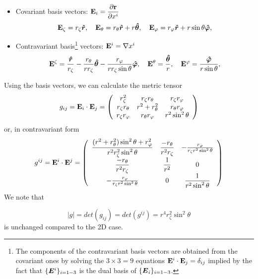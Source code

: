 \begin{itemize}
\item Covariant basis vectors: $\displaystyle\mathbf{E}_i=\frac{\partial\mathbf{r}}
{\partial x^i}$
\begin{equation}
\mathbf{E}_\zeta=r_\zeta\boldsymbol{\hat r}, \quad
\mathbf{E}_\theta=r_\theta\boldsymbol{\hat r}+r\boldsymbol{\hat \theta}, \quad
\mathbf{E}_\varphi=r_\varphi\boldsymbol{\hat r}+r\sin\theta\boldsymbol{\hat \varphi},
\end{equation}
\item Contravariant basis\footnote{The components of the contravariant
basis vectors are obtained from the covariant ones by solving the
$3\times3=9$ equations $\mathbf{E}^i\cdot\mathbf{E}_j=\delta_{ij}$ implied by
the fact that $\{\vE^i\}_{i=1-3}$ is the dual basis of
$\{\vE_i\}_{i=1-3}$.} vectors: $\mathbf{E}^i=\nabla x^i$
\begin{equation}
\mathbf{E}^\zeta=\frac{\boldsymbol{\hat r}}{r_\zeta}-\frac{r_\theta}{rr_\zeta}\boldsymbol{\hat \theta} -
\frac{r_\varphi}{rr_\zeta\sin\theta}\boldsymbol{\hat \varphi}, \quad
\mathbf{E}^\theta=\frac{\boldsymbol{\hat \theta}}{r},\quad
\mathbf{E}^{\varphi}=\frac{\boldsymbol{\hat \varphi}}{r\sin\theta},
\end{equation}
\end{itemize}

Using the basis vectors, we can calculate the metric tensor
\begin{equation}
g_{ij}=\mathbf{E}_i\cdot\mathbf{E}_j=\left(
\begin{array}{ccc}
r_\zeta^2&r_\zeta r_\theta&r_\zeta r_\varphi\\
r_\zeta r_\theta&r^2+r_\theta^2&r_\theta r_\varphi\\
r_\zeta r_\varphi&r_\theta r_\varphi&r^2\sin^2\theta
\end{array}
\right)
\end{equation}
or, in contravariant form
\begin{equation}
g^{ij}=\mathbf{E}^i\cdot\mathbf{E}^j=\left(
\begin{array}{ccc}
\displaystyle\frac{(r^2+r_\theta^2)\sin^2\theta+r^2_\varphi}{r^2r_\zeta^2\sin^2\theta}&\displaystyle\frac{-r_\theta}{r^2r_\zeta}&-\frac{r_\varphi}{r_\zeta
r^2\sin^2\theta}\\
\displaystyle\frac{-r_\theta}{r^2r_\zeta}&\displaystyle\frac{1}{r^2}&0\\
-\frac{r_\varphi}{r_\zeta
r^2\sin^2\theta}&0&\displaystyle\frac{1}{r^2\sin^2\theta}
\end{array}
\right)
\end{equation}
We note that

\begin{equation}
|g|=det(g_{ij})=det(g^{ij})=r^4r^2_\zeta\sin^2\theta
\end{equation}
is unchanged compared to the 2D case.



